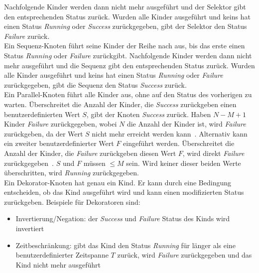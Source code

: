 Nachfolgende Kinder werden dann nicht mehr ausgeführt und der Selektor gibt den entsprechenden Status zurück.
Wurden alle Kinder ausgeführt und keins hat einen Status \emph{Running} oder \emph{Success} zurückgegeben, gibt der Selektor den Status \emph{Failure} zurück.\\
Ein Sequenz-Knoten führt seine Kinder der Reihe nach aus, bis das erste einen Status \emph{Running} oder \emph{Failure} zurückgibt.
Nachfolgende Kinder werden dann nicht mehr ausgeführt und die Sequenz gibt den entsprechenden Status zurück.
Wurden alle Kinder ausgeführt und keins hat einen Status \emph{Running} oder \emph{Failure} zurückgegeben, gibt die Sequenz den Status \emph{Success} zurück.\\
Ein Parallel-Knoten führt alle Kinder aus, ohne auf den Status des vorherigen zu warten.
Überschreitet die Anzahl der Kinder, die \emph{Success} zurückgeben einen benutzerdefinierten Wert $S$, gibt der Knoten \emph{Success} zurück.
Haben $N-M+1$ Kinder \emph{Failure} zurückgegeben, wobei $N$ die Anzahl der Kinder ist, wird \emph{Failure} zurückgeben, da der Wert $S$ nicht mehr erreicht werden kann~\cite{bt_book}.
Alternativ kann ein zweiter benutzerdefinierter Wert $F$ eingeführt werden.
Überschreitet die Anzahl der Kinder, die \emph{Failure} zurückgeben diesen Wert $F$, wird direkt \emph{Failure} zurückgegeben~\cite{bt_1}.
$S$ und $F$ müssen $\leq M$ sein.
Wird keiner dieser beiden Werte überschritten, wird \emph{Running} zurückgegeben.\\
Ein Dekorator-Knoten hat genau ein Kind.
Er kann durch eine Bedingung entscheiden, ob das Kind ausgeführt wird und kann einen modifizierten Status zurückgeben.
Beispiele für Dekoratoren sind:
\begin{itemize}
    \item Invertierung/Negation: der \emph{Success} und \emph{Failure} Status des Kinds wird invertiert
    \item Zeitbeschränkung: gibt das Kind den Status \emph{Running} für länger als eine benutzerdefinierter Zeitspanne $T$ zurück, wird \emph{Failure} zurückgegeben und das Kind nicht mehr ausgeführt
\end{itemize}\cite{bt_book}

